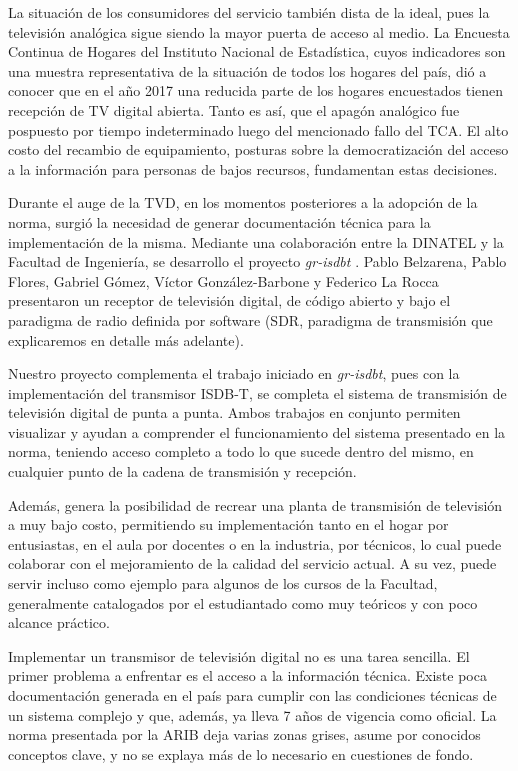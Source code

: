La situación de los consumidores del servicio también dista de la ideal, pues la televisión analógica sigue siendo la mayor puerta de acceso al medio. La Encuesta Continua de Hogares del Instituto Nacional de Estadística\cite{ine2017}, cuyos indicadores son una muestra representativa de la situación de todos los hogares del país, dió a conocer que en el año 2017 una reducida parte de los hogares encuestados tienen recepción de TV digital abierta. Tanto es así, que el apagón analógico fue pospuesto por tiempo indeterminado luego del mencionado fallo del TCA. El alto costo del recambio de equipamiento, posturas sobre la democratización del acceso a la información para personas de bajos recursos, fundamentan estas decisiones.

Durante el auge de la TVD, en los momentos posteriores a la adopción de la norma, surgió la necesidad de generar documentación técnica para la implementación de la misma. Mediante una colaboración entre la DINATEL y la Facultad de Ingeniería, se desarrollo el proyecto \textit{gr-isdbt} \cite{winCom16}. Pablo Belzarena, Pablo Flores, Gabriel Gómez, Víctor González-Barbone y Federico La Rocca presentaron un receptor de televisión digital, de código abierto y bajo el paradigma de radio definida por software (SDR, paradigma de transmisión que explicaremos en detalle más adelante).

Nuestro proyecto complementa el trabajo iniciado en \textit{gr-isdbt}, pues con la implementación del transmisor ISDB-T, se completa el sistema de transmisión de televisión digital de punta a punta. Ambos trabajos en conjunto permiten visualizar y ayudan a comprender el funcionamiento del sistema presentado en la norma, teniendo acceso completo a todo lo que sucede dentro del mismo, en cualquier punto de la cadena de transmisión y recepción. 

Además, genera la posibilidad de recrear una planta de transmisión de televisión a muy bajo costo, permitiendo su implementación tanto en el hogar por entusiastas, en el aula por docentes o en la industria, por técnicos, lo cual puede colaborar con el mejoramiento de la calidad del servicio actual. A su vez, puede servir incluso como ejemplo para algunos de los cursos de la Facultad, generalmente catalogados por el estudiantado como muy teóricos y con poco alcance práctico. 

Implementar un transmisor de televisión digital no es una tarea sencilla. El primer problema a enfrentar es el acceso a la información técnica. Existe poca documentación generada en el país para cumplir con las condiciones técnicas de un sistema complejo y que, además, ya lleva 7 años de vigencia como oficial. La norma presentada por la ARIB deja varias zonas grises, asume por conocidos conceptos clave, y no se explaya más de lo necesario en cuestiones de fondo. 

